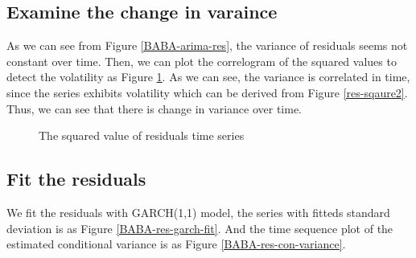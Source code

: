 \documentclass{article}
\begin{document}
\subsection{Examine the change in varaince}
As we can see from Figure \ref{BABA-arima-res}, the variance of residuals seems not constant over time. Then, we can plot the correlogram of the squared values to detect the volatility as Figure \ref{res-square}. As we can see, the variance is correlated in time, since the series exhibits volatility which can be derived from Figure \ref{res-sqaure2}. 
Thus, we can see that there is change in variance over time.
\begin{figure}[H]
    \centering
    \quad
    \caption{The squared value of residuals time series}
    \label{res-square}
\end{figure}
\subsection{Fit the residuals}
We fit the residuals with GARCH(1,1) model, the series with fitteds standard deviation is as Figure \ref{BABA-res-garch-fit}. 
And the time sequence plot of the estimated conditional variance is as Figure \ref{BABA-res-con-variance}. 
\end{document}
